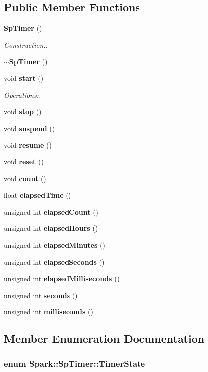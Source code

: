 \subsection*{Public Member Functions}
\begin{CompactItemize}
\item 
{\bf Sp\-Timer} ()
\begin{CompactList}\small\item\em Construction:. \item\end{CompactList}\item 
{\bf $\sim$Sp\-Timer} ()
\item 
void {\bf start} ()
\begin{CompactList}\small\item\em Operations:. \item\end{CompactList}\item 
void {\bf stop} ()
\item 
void {\bf suspend} ()
\item 
void {\bf resume} ()
\item 
void {\bf reset} ()
\item 
void {\bf count} ()
\item 
float {\bf elapsed\-Time} ()
\item 
unsigned int {\bf elapsed\-Count} ()
\item 
unsigned int {\bf elapsed\-Hours} ()
\item 
unsigned int {\bf elapsed\-Minutes} ()
\item 
unsigned int {\bf elapsed\-Seconds} ()
\item 
unsigned int {\bf elapsed\-Milliseconds} ()
\item 
unsigned int {\bf seconds} ()
\item 
unsigned int {\bf milliseconds} ()
\end{CompactItemize}


\subsection{Member Enumeration Documentation}
\subsubsection{\setlength{\rightskip}{0pt plus 5cm}enum {\bf Spark::Sp\-Timer::Timer\-State}}\label{classSpark_1_1SpTimer_w4}


